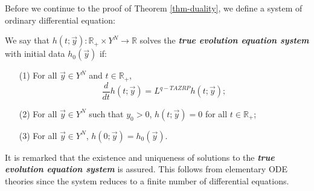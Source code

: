 Before we continue to the proof of Theorem \ref{thm-duality}, we define a system of ordinary differential equation:
\begin{definition}
\label{dfn:true-evolution-equation}
We say that $h(t;\vec{y}): \mathbb{R}_+ \times Y^N \rightarrow \mathbb{R}$ solves the \textbf{\emph{true evolution equation system}} with initial data $h_0(\vec{y})$ if:
\begin{enumerate}
\item[(1)] For all $\vec{y} \in Y^N$ and $t \in \mathbb{R}_+$, $$\frac{d}{dt} h(t;\vec{y}) = L^{q-TAZRP} h(t;\vec{y});$$
\item[(2)] For all $\vec{y} \in Y^N$ such that $y_0 > 0$, $h(t;\vec{y}) = 0$ for all $t \in \mathbb{R}_+$;
\item[(3)] For all $\vec{y} \in Y^N$, $h(0;\vec{y}) = h_0(\vec{y})$.
\end{enumerate}
\end{definition}

\begin{remark}
It is remarked that the existence and uniqueness of solutions to the \textbf{\emph{true evolution equation system}} is assured. This follows from elementary ODE theories since the system reduces to a finite number of differential equations. 
\end{remark}

